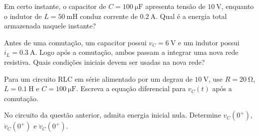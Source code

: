 \begin{questao}[3]{}

Em certo instante, o capacitor de $C=\SI{100}{\micro\farad}$ apresenta
tensão de $\SI{10}{\volt}$, enquanto o indutor de
$L=\SI{50}{\milli\henry}$ conduz corrente de $\SI{0.2}{\ampere}$. Qual é a energia total armazenada naquele instante?


\end{questao}
\begin{questao}[3]{}

Antes de uma comutação, um capacitor possui $v_C=\SI{6}{\volt}$ e um indutor
possui $i_L=\SI{0.3}{\ampere}$. Logo após a comutação, ambos passam a integrar
uma nova rede resistiva. Quais condições iniciais devem ser usadas na nova rede?


\end{questao}
\begin{questao}[3]{}

Para um circuito RLC em série alimentado por um degrau de $\SI{10}{\volt}$, use
$R=\SI{20}{\ohm}$, $L=\SI{0.1}{\henry}$ e $C=\SI{100}{\micro\farad}$. Escreva
a equação diferencial para $v_C(t)$ após a comutação.


\end{questao}
\begin{questao}[3]{}

No circuito da questão anterior, admita energia inicial nula. Determine
$v_C(0^+)$, $\dot v_C(0^+)$ e $\ddot v_C(0^+)$.


\end{questao}

\gabarito[Nível 3]

